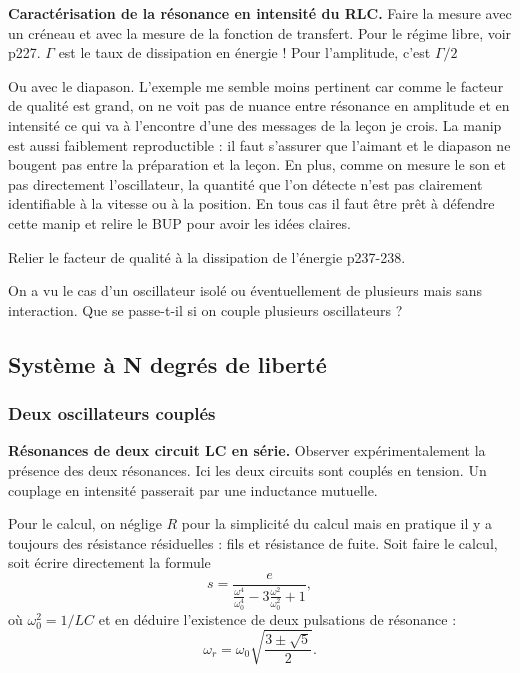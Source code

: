 \begin{experience}
\textbf{Caractérisation de la résonance en intensité du RLC.}
Faire la mesure avec un créneau et avec la mesure de la fonction de transfert.
Pour le régime libre, voir \cite{Michel2017} p227.
$\Gamma$ est le taux de dissipation en énergie !
Pour l'amplitude, c'est $\Gamma/2$

\noindent
Ou avec le diapason.
L'exemple me semble moins pertinent car comme le facteur de qualité est grand, on ne voit pas de nuance entre résonance en amplitude et en intensité ce qui va à l'encontre d'une des messages de la leçon je crois.
La manip est aussi faiblement reproductible : il faut s'assurer que l'aimant et le diapason ne bougent pas entre la préparation et la leçon.
En plus, comme on mesure le son et pas directement l'oscillateur, la quantité que l'on détecte n'est pas clairement identifiable à la vitesse ou à la position.
En tous cas il faut être prêt à défendre cette manip et relire le BUP pour avoir les idées claires.
\end{experience}

Relier le facteur de qualité à la dissipation de l'énergie \cite{Faroux1996} p237-238.

\begin{transition}
On a vu le cas d'un oscillateur isolé ou éventuellement de plusieurs mais sans interaction.
Que se passe-t-il si on couple plusieurs oscillateurs ?
\end{transition}

\subsection{Système à N degrés de liberté}

\subsubsection{Deux oscillateurs couplés}

\begin{experience}
\textbf{Résonances de deux circuit LC en série.}
Observer expérimentalement la présence des deux résonances.
Ici les deux circuits sont couplés en tension.
Un couplage en intensité passerait par une inductance mutuelle.
\end{experience}

Pour le calcul, on néglige $R$ pour la simplicité du calcul mais en pratique il y a toujours des résistance résiduelles : fils et résistance de fuite.
Soit faire le calcul, soit écrire directement la formule 
\begin{equation}
s = \frac{e}{\frac{\omega^4}{\omega_0^4} - 3\frac{\omega^2}{\omega_0^2} + 1},
\end{equation}
où $\omega_0^2=1/LC$ et en déduire l'existence de deux pulsations de résonance :
\begin{equation}
\omega_r = \omega_0 \sqrt{\frac{3\pm\sqrt{5}}{2}}.
\end{equation}

